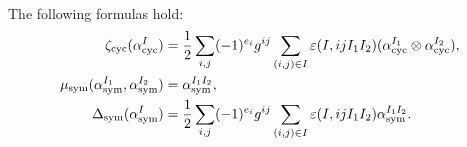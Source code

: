 \documentclass[\MainFolder/Text.tex]{subfiles}
\begin{document}
\begin{Proposition}
\begin{equation}
\begin{tikzcd}
\end{tikzcd}
\end{equation}
The following formulas hold:
\begin{equation}\label{Eq:CycSymExplicit}
\begin{aligned}
 \zeta_{\mathrm{cyc}}(\alpha^I_{\mathrm{cyc}}) &= \frac{1}{2}\sum_{i,j} (-1)^{e_i} g^{ij} \sum_{(i,j)\in I} \varepsilon(I,i j I_1 I_2)(\alpha^{I_1}_{\mathrm{cyc}}\otimes \alpha^{I_2}_{\mathrm{cyc}}),\\
 \mu_{\mathrm{sym}}(\alpha^{I_1}_{\mathrm{sym}},\alpha^{I_2}_{\mathrm{sym}}) &= \alpha^{I_1 I_2}_{\mathrm{sym}},\\
 \operatorname{\Delta}_{\mathrm{sym}}(\alpha^I_{\mathrm{sym}}) &= \frac{1}{2}\sum_{i,j} (-1)^{e_i} g^{ij} \sum_{(i,j)\in I} \varepsilon(I,i j I_1 I_2)\alpha^{I_1 I_2}_{\mathrm{sym}}.
\end{aligned} 
\end{equation}
\end{Proposition}
\end{document}
